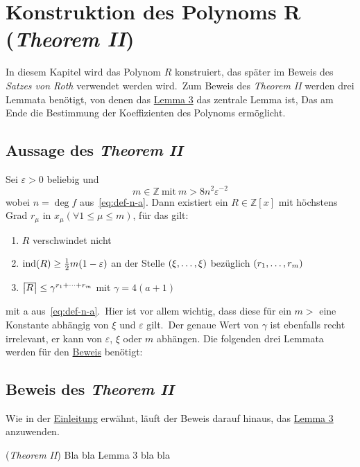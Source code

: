 
\section{Konstruktion des Polynoms R (\emph{Theorem II})}
    \label{sec:th2}
    \textrm{In diesem Kapitel wird das Polynom $R$ konstruiert, das später im Beweis des \emph{Satzes von Roth}
    verwendet werden wird.\ Zum Beweis des \emph{Theorem II} werden drei Lemmata benötigt, von denen das \hyperref
    [subsec:lemma3]{Lemma 3} das zentrale Lemma ist, Das am Ende die Bestimmung der Koeffizienten des Polynoms
    ermöglicht.}
    
    \subsection{Aussage des \emph{Theorem II}}
        \label{subsec:th2}
        Sei $\varepsilon > 0$ beliebig und
        \begin{equation}
            m \in \mathbb{Z} \  \text{mit} \  m > 8 n^2 \varepsilon^{-2} \label{eq:def-m}
        \end{equation}
        wobei $n = \deg f$ aus~\eqref{eq:def-n-a}.
        \textrm{Dann existiert ein $R \in \mathbb{Z}[x]$ mit höchstens Grad $r_\mu$ in $x_\mu (\forall 1 \leq \mu
        \leq m)$, für das gilt:}
        \begin{enumerate}
            \item $R$ verschwindet nicht
            \item \textrm{$\operatorname{ind}(R) \geq \frac{1}{2} m (1 - \varepsilon)$ an der Stelle $(\xi, \dots, \xi)$ bezüglich
                $(r_1, \dots, r_m)$}
            \item $\content{R} \leq \gamma^{r_1 + \dots + r_m}$ mit $\gamma = 4 (a + 1)$
        \end{enumerate}
        \textrm{mit a aus~\eqref{eq:def-n-a}.\ Hier ist vor allem wichtig, dass diese für ein $m >$ eine Konstante
        abhängig von $\xi$ und $\varepsilon$ gilt.\ Der genaue Wert von $\gamma$ ist ebenfalls recht irrelevant, er
        kann von $\varepsilon$, $\xi$ oder $m$ abhängen.}
        \newline \newline
        \textrm{Die folgenden drei Lemmata werden für den \hyperref[subsec:proof-th2]{Beweis} benötigt:}
    
    
    
    \subsection{Beweis des \emph{Theorem II}}
        \label{subsec:proof-th2}
        \textrm{Wie in der \hyperref[sec:th2]{Einleitung} erwähnt, läuft der Beweis darauf hinaus, das \hyperref
        [subsec:lemma3]{Lemma 3} anzuwenden.}
        \begin{proofname}{(\emph{Theorem II})}
            Bla bla Lemma 3 bla bla
        \end{proofname}
    
